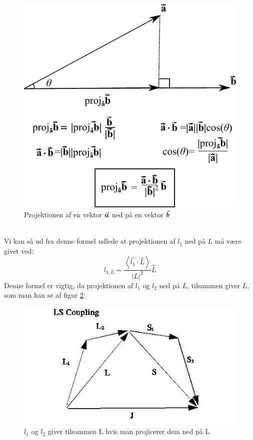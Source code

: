 \documentclass[../../Atom-ogMolekylefysik.tex]{subfiles}
\begin{document}
\begin{figure}[h]
    \centering
    \includegraphics[scale=0.7]{Atom-ogMolekylefysik/billeder/projektion.pdf}
    \caption{Projektionen af en vektor ${\vec{\boldsymbol{a}}}$ ned på en vektor ${\vec{\boldsymbol{b}}}$}
    \label{fig:amo:vektor-projektion}
\end{figure}\\
Vi kan så ud fra denne formel udlede at projektionen af $l_1$ ned på $L$ må være givet ved:
\begin{equation}
    l_{1,L}=\frac{\left<\hat{l_1}\cdot\hat{L}\right>}{|L|^2}\hat{L}
\end{equation}
Denne formel er vigtig, da projektionen af $l_1$ og $l_2$ ned på $L$, tilsammen giver $L$, som man kan se af figur \ref{fig:amo:LS-projektion}:
\begin{figure}[h]
    \centering
    \includegraphics[scale=0.5]{Atom-ogMolekylefysik/billeder/LS-vektor.jpg}
    \caption{${l_1}$ og $l_2$ giver tilsammen L hvis man projicerer dem ned på L}
    \label{fig:amo:LS-projektion}
\end{figure}\\
\end{document}
